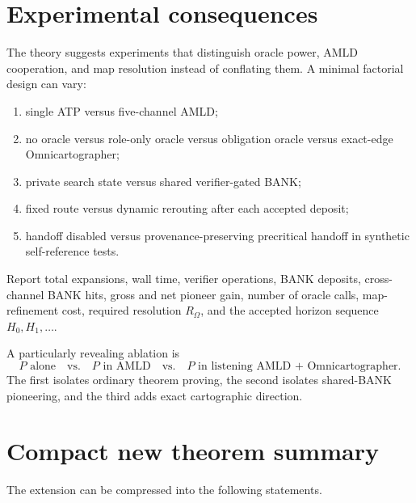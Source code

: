 \documentclass[11pt]{article}
\theoremstyle{remark}
\newcommand{\Omni}{\Omega}
\begin{document}
\section{Experimental consequences}

The theory suggests experiments that distinguish oracle power, AMLD cooperation, and map resolution instead of conflating them. A minimal factorial design can vary:
\begin{enumerate}
\item single ATP versus five-channel AMLD;
\item no oracle versus role-only oracle versus obligation oracle versus exact-edge Omnicartographer;
\item private search state versus shared verifier-gated BANK;
\item fixed route versus dynamic rerouting after each accepted deposit;
\item handoff disabled versus provenance-preserving precritical handoff in synthetic self-reference tests.
\end{enumerate}
Report total expansions, wall time, verifier operations, BANK deposits, cross-channel BANK hits, gross and net pioneer gain, number of oracle calls, map-refinement cost, required resolution $R_{\Omni}$, and the accepted horizon sequence $H_0,H_1,\dots$.

A particularly revealing ablation is
\[
P\text{ alone}
\quad\text{vs.}\quad
P\text{ in AMLD}
\quad\text{vs.}\quad
P\text{ in listening AMLD + Omnicartographer}.
\]
The first isolates ordinary theorem proving, the second isolates shared-BANK pioneering, and the third adds exact cartographic direction.

\section{Compact new theorem summary}

The extension can be compressed into the following statements.
\end{document}
